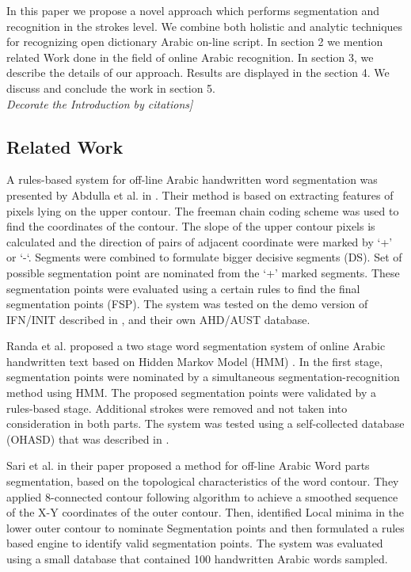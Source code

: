 \documentclass[12pt,journal,compsoc]{IEEEtran}
\begin{document}
In this paper we propose a novel approach which performs segmentation and recognition in the strokes level. We combine both holistic and analytic techniques for recognizing open dictionary Arabic on-line script. In section 2 we mention related Work done in the field of online Arabic recognition. In section 3, we describe the details of our approach. Results are displayed in the section 4. We discuss and conclude the work in section 5.
\\ \emph{Decorate the Introduction by citations]}

\subsection{Related Work}
A rules-based system for off-line Arabic handwritten word segmentation was presented by Abdulla et al. in \cite{abdulla2008off}. Their method is based on extracting features of pixels lying on the upper contour. The freeman chain coding scheme was used to find the coordinates of the contour. The slope of the upper contour pixels is calculated and the direction of pairs of adjacent coordinate were marked by ‘+’ or ‘-‘. Segments were combined to formulate bigger decisive segments (DS). Set of possible segmentation point are nominated from the ‘+’ marked segments. These segmentation points were evaluated using a certain rules to find the final segmentation points (FSP). The system was tested on the demo version of IFN/INIT described in \cite{pechwitz2002ifn} , and their own AHD/AUST database.

Randa et al. proposed a two stage word segmentation system of online Arabic handwritten text based on Hidden Markov Model (HMM) \cite{elanwar2012unconstrained}. In the first stage, segmentation points were nominated by a simultaneous segmentation-recognition method using HMM.  The proposed segmentation points were validated by a rules-based stage. Additional strokes were removed and not taken into consideration in both parts. The system was tested using a self-collected database (OHASD) that was described in \cite{elanwar2010ohasd}.

Sari et al. in their paper \cite{sari2002off} proposed a method for off-line Arabic Word parts segmentation, based on the topological characteristics of the word contour. They applied 8-connected contour following algorithm to achieve a smoothed sequence of the X-Y coordinates of the outer contour. Then, identified Local minima in the lower outer contour to nominate Segmentation points and then formulated a rules based engine to identify valid segmentation points. The system was evaluated using a small database that contained 100 handwritten Arabic words sampled.
\end{document}
